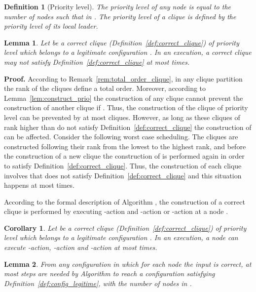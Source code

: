 \documentclass[11pt,letterpaper,onecolumn]{article}
\newtheorem{definition}{Definition}
\newtheorem{corollary}{Corollary}
\newtheorem{lemma}{Lemma}
\newenvironment{proof}{\noindent \begin{rm}{\textbf{Proof.} }}{\hspace*{\fill}\par\end{rm} \vspace{.3cm}}
\begin{document}
\begin{definition}[Priority level]
The \emph{priority level} of any node  is equal to the number of nodes  such that  in . The priority level of a clique is defined by the priority level of its local leader.
\end{definition}

\begin{lemma}
Let  be a correct clique (Definition~\ref{def:correct_clique}) of priority level  which belongs to a legitimate configuration . In an execution, a correct clique  may not satisfy Definition~\ref{def:correct_clique} at most  times.
\end{lemma}

\begin{proof}
According to Remark~\ref{rem:total_order_clique}, in any clique partition the rank of the cliques define a total order. Moreover, according to Lemma~\ref{lem:construct_prio} the construction of any clique  cannot prevent the construction of another clique  if . Thus, the construction of the clique  of priority level  can be prevented by at most  cliques. However, as long as these  cliques of rank higher than  do not satisfy Definition~\ref{def:correct_clique} the construction of  can be affected. Consider the following worst case scheduling. The cliques  are constructed following their rank from the lowest to the highest rank, and before the construction of a new clique  the construction of  is performed again in order to satisfy Definition~\ref{def:correct_clique}. Thus, the construction of each clique  involves that  does not satisfy Definition~\ref{def:correct_clique} and this situation happens at most  times.
\end{proof}

According to the formal description of Algorithm , the construction of a correct clique  is performed by executing -action and -action or -action at a node .

\begin{corollary}
\label{cor:other_actions_steps}
Let  be a correct clique (Definition~\ref{def:correct_clique}) of priority level  which belongs to a legitimate configuration . In an execution, a node  can execute -action, -action and -action at most  times.
\end{corollary}

\begin{lemma}
\label{lem:config_legitime_step}
From any configuration in which for each node  the input  is correct, at most  steps are needed by Algorithm  to reach a configuration satisfying Definition~\ref{def:config_legitime}, with  the number of nodes in .
\end{lemma}
\end{document}
